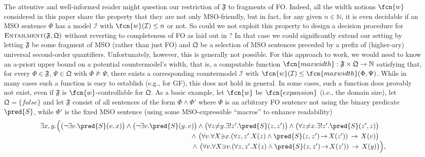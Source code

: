\begin{remark}
The attentive and well-informed reader might question our restriction of $\mathfrak{F}$ to fragments of FO. Indeed, all the width notions $\fcn{w}$ considered in this paper share the property that they are not only MSO-friendly, but in fact, for any given $n \in \mathbb{N}$, it is even decidable if an MSO sentence $\Phi$ has a model $\mathcal{I}$ with $\fcn{w}(\mathcal{I})\leq n$ or not. So could we not exploit this property to design a decision procedure for $\textsc{Entailment}(\mathfrak{F},\mathfrak{Q})$ without reverting to completeness of FO as laid out in ? In that case we could significantly extend our setting by letting $\mathfrak{F}$ be some fragment of MSO (rather than just FO) and $\mathfrak{Q}$ be a selection of MSO sentences preceded by a prefix of (higher-ary) universal second-order quantifiers. Unfortunately, however, this is generally not possible. For this approach to work, we would need to know an a-priori upper bound on a potential countermodel's width, that is, a computable function $\fcn{maxwidth}: \mathfrak{F} \times \mathfrak{Q} \to \mathbb{N}$ satisfying that, for every $\Phi \in \mathfrak{F}$, $\Psi \in \mathfrak{Q}$ with $\Phi \not\models\Psi$, there exists a corresponding countermodel $\mathcal{I}$ with $\fcn{w}(\mathcal{I})\leq \fcn{maxwidth}(\Phi,\Psi)$. While in many cases such a function is easy to establish (e.g., for GF), this does not hold in general. In some cases, such a function does provably not exist, even if $\mathfrak{F}$ is $\fcn{w}$-controllable for $\mathfrak{Q}$. As a basic example, let $\fcn{w}$ be $\fcn{expansion}$ (i.e., the domain size), let $\mathfrak{Q} = \{\mathit{false}\}$ and let $\mathfrak{F}$ consist of all sentences of the form $\Phi \wedge \Phi'$ where $\Phi$ is an arbitrary FO sentence not using the binary predicate $\pred{S}$, while $\Phi'$ is the fixed MSO sentence (using some MSO-expressible ``macros'' to enhance readability)
$$
\begin{array}{r}
\exists x,y.\Big( \big(\neg \exists v.\pred{S}(v,x)\big) \wedge \big(\neg \exists v.\pred{S}(y,v)\big) \wedge  \big(\forall z {\not=} y. \exists ! z'. \pred{S}(z,z')\big) \wedge \big(\forall z {\not=} x. \exists ! z'. \pred{S}(z',z)\big)\quad \\
\wedge\ \big(\forall v. \forall X {\ni} x. (\forall z,z'. X(z) \wedge \pred{S}(z,z') \,{\to}\, X(z')) \, \to \, X(v) \big)\quad \\
\wedge\ \big(\forall v. \forall X {\ni} v. (\forall z,z'. X(z) \wedge \pred{S}(z,z') \,{\to}\, X(z')) \, \to \, X(y) \big)\Big), \\

\end{array}$$
\end{remark}
